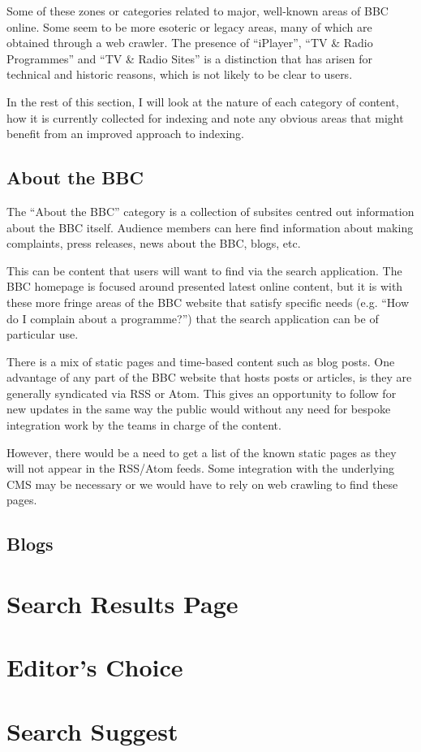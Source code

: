 Some of these zones or categories related to major, well-known areas of
BBC online. Some seem to be more esoteric or legacy areas, many of which
are obtained through a web crawler. The presence of ``iPlayer'',
``TV \& Radio Programmes'' and ``TV & Radio Sites'' is a distinction that
has arisen for technical and historic reasons, which is not likely to be
clear to users.

In the rest of this section, I will look at the nature of each category
of content, how it is currently collected for indexing and note any
obvious areas that might benefit from an improved approach to indexing.

\subsection{About the BBC}

The ``About the BBC'' category is a collection of subsites centred out
information about the BBC itself. Audience members can here find information
about making complaints, press releases, news about the BBC, blogs, etc.

This can be content that users will want to find via the search application.
The BBC homepage is focused around presented latest online content, but it
is with these more fringe areas of the BBC website that satisfy specific
needs (e.g. ``How do I complain about a programme?'') that the
search application can be of particular use.

There is a mix of static pages and time-based content such as blog posts.
One advantage of any part of the BBC website that hosts posts or articles,
is they are generally syndicated via RSS or Atom. This gives an opportunity
to follow for new updates in the same way the public would without any
need for bespoke integration work by the teams in charge of the content.

However, there would be a need to get a list of the known static pages
as they will not appear in the RSS/Atom feeds. Some integration with the
underlying CMS may be necessary or we would have to rely on web crawling
to find these pages.

\subsection{Blogs}



\section{Search Results Page}

\section{Editor's Choice}

\section{Search Suggest}
